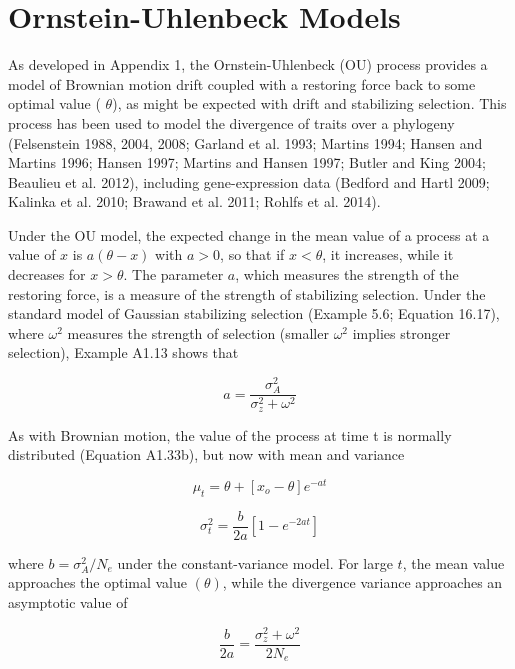 \documentclass{article}
\begin{document}
\section{Ornstein-Uhlenbeck Models}
As developed in Appendix 1, the Ornstein-Uhlenbeck (OU) process provides a model of Brownian motion drift coupled with a restoring force back to some optimal value ( $ \theta $), as might be expected with drift and stabilizing selection. This process has been used to model the divergence of traits over a phylogeny (Felsenstein 1988, 2004, 2008; Garland et al. 1993; Martins 1994; Hansen and Martins 1996; Hansen 1997; Martins and Hansen 1997; Butler and King 2004; Beaulieu et al. 2012), including gene-expression data (Bedford and Hartl 2009; Kalinka et al. 2010; Brawand et al. 2011; Rohlfs et al. 2014).

Under the OU model, the expected change in the mean value of a process at a value of  $ x $ is  $ a(\theta - x) $ with  $ a > 0 $, so that if  $ x < \theta $, it increases, while it decreases for  $ x > \theta $. The parameter  $ a $, which measures the strength of the restoring force, is a measure of the strength of stabilizing selection. Under the standard model of Gaussian stabilizing selection (Example 5.6; Equation 16.17), where  $ \omega^2 $ measures the strength of selection (smaller  $ \omega^2 $ implies stronger selection), Example A1.13 shows that

\begin{equation}
a=\frac{\sigma_{A}^{2}}{\sigma_{z}^{2}+\omega^{2}}
\tag{12.22a}
\label{eq:12_22a}
\end{equation}

As with Brownian motion, the value of the process at time t is normally distributed (Equation A1.33b), but now with mean and variance

\begin{equation}
\mu_{t}=\theta+[x_{o}-\theta]e^{-at}
\tag{12.22b}
\label{eq:12_22b}
\end{equation}

\begin{equation}
\sigma_{t}^{2}=\frac{b}{2a}[1-e^{-2at}]
\tag{12.22c}
\label{eq:12_22c}
\end{equation}

where  $ b = \sigma_A^2 / N_e $ under the constant-variance model. For large  $ t $, the mean value approaches the optimal value  $ (\theta) $, while the divergence variance approaches an asymptotic value of

\begin{equation}
\frac{b}{2a}=\frac{\sigma_{z}^{2}+\omega^{2}}{2N_{e}}
\tag{12.22d}
\label{eq:12_22d}
\end{equation}
\end{document}
